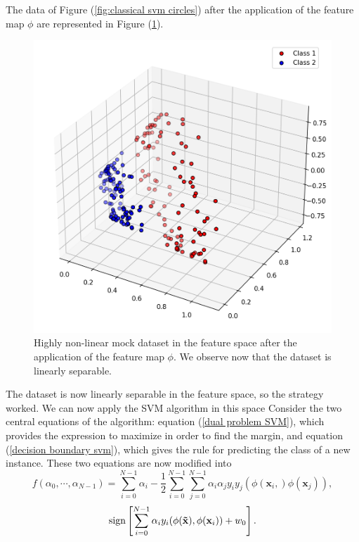 \documentclass[a4paper]{article}
\begin{document}
The data of Figure (\ref{fig:classical svm circles}) after the application of the feature map $\phi$ are represented in Figure (\ref{fig:classical svm circle 3d}). 
\begin{figure}[h!]
    \centering
    \includegraphics[width=\textwidth]{images/circles3d.png}
    \caption{Highly non-linear mock dataset in the feature space after the application of the feature map $\phi$. We observe now that the dataset is linearly separable.}
    \label{fig:classical svm circle 3d}
\end{figure}
The dataset is now linearly separable in the feature space, so the strategy worked. We can now apply the SVM algorithm in this space Consider the two central equations of the algorithm: equation (\ref{dual problem SVM}), which provides the expression to maximize in order to find the margin, and equation (\ref{decision boundary svm}), which gives the rule for predicting the class of a new instance. These two equations are now modified into 
\begin{equation}
    f(\alpha_0,\cdots,\alpha_{N-1})=\sum_{i=0}^{N-1} \alpha_i-\frac{1}{2}\sum_{i=0}^{N-1}\sum_{j=0}^{N-1}\alpha_i\alpha_jy_iy_j(\phi(\mathbf{x}_i,)\phi(\mathbf{x}_j)),
    \label{kernel max}
\end{equation}
\begin{equation}
    \textup{sign}\left[\sum_{i=0}^{N-1}\alpha_iy_i(\phi(\mathbf{\tilde{x}}), \phi(\mathbf{x}_i))+w_0\right].
    \label{kernel prodiction}
\end{equation}
\end{document}

